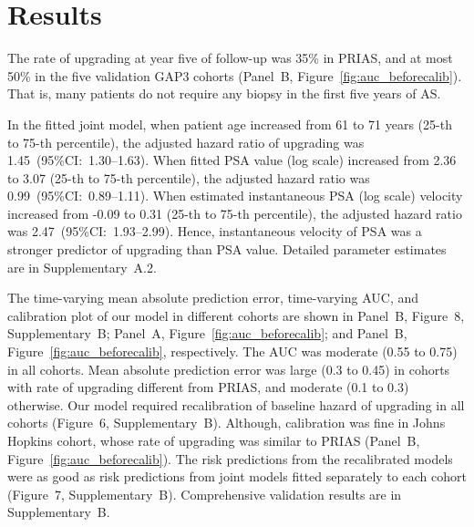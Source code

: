 \section{Results}
The rate of upgrading at year five of follow-up was 35\% in PRIAS, and at most 50\% in the five validation GAP3 cohorts (Panel~B, Figure~\ref{fig:auc_beforecalib}). That is, many patients do not require any biopsy in the first five years of AS. 

In the fitted joint model, when patient age increased from 61 to 71 years (25-th to 75-th percentile), the adjusted hazard ratio of upgrading was 1.45~(95\%CI:~1.30--1.63). When fitted PSA value (log scale) increased from 2.36 to 3.07 (25-th to 75-th percentile), the adjusted hazard ratio was 0.99~(95\%CI:~0.89--1.11). When estimated instantaneous PSA (log scale) velocity increased from -0.09 to 0.31 (25-th to 75-th percentile), the adjusted hazard ratio was 2.47~(95\%CI:~1.93--2.99). Hence, instantaneous velocity of PSA was a stronger predictor of upgrading than PSA value. Detailed parameter estimates are in Supplementary~A.2.

The time-varying mean absolute prediction error, time-varying AUC, and calibration plot of our model in different cohorts are shown in Panel~B, Figure~8, Supplementary~B; Panel~A, Figure~\ref{fig:auc_beforecalib}; and Panel~B, Figure~\ref{fig:auc_beforecalib}, respectively. The AUC was moderate (0.55 to 0.75) in all cohorts. Mean absolute prediction error was large (0.3 to 0.45) in cohorts with rate of upgrading different from PRIAS, and moderate (0.1 to 0.3) otherwise. Our model required recalibration of baseline hazard of upgrading in all cohorts (Figure~6, Supplementary~B). Although, calibration was fine in Johns Hopkins cohort, whose rate of upgrading was similar to PRIAS (Panel~B, Figure~\ref{fig:auc_beforecalib}). The risk predictions from the recalibrated models were as good as risk predictions from joint models fitted separately to each cohort (Figure~7, Supplementary~B). Comprehensive validation results are in Supplementary~B.

